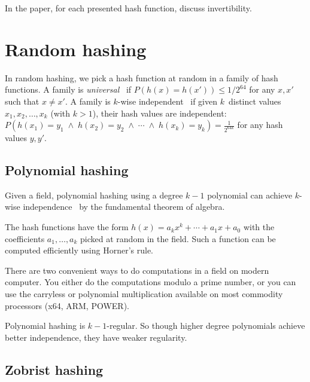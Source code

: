 \documentclass{article}
\begin{document}
In the paper, for each presented hash function, discuss invertibility.





\section{Random hashing}


In random hashing, 
we pick a hash function  at random in a family of
hash functions.  A family  is
  \emph{universal}~\cite{carter1979universal} if
 $P\left (h(x)=h(x')\right )\leq 1/2^64$
for any $x,x'$ such that $x \neq x'$.
A family is $k$-wise independent~\cite{lemi:one-pass-journal,Lemire2012604} if given  $k$~distinct values $x_1,x_2, \ldots, x_k$ (with $k>1$), their hash
values are independent: $
P\left (h(x_1)= y_1  \; \land  \; h(x_2)= y_2 \; \land  \; \cdots \; \land  \; h(x_k)= y_k  \right ) =\frac{1}{2^{64k}}$
for any hash values $y,y'$. 

\subsection{Polynomial hashing}
Given a field, polynomial hashing using a degree $k-1$ polynomial can achieve $k$-wise independence~\cite{carter1979universal,Thorup:2004:TBH:982792.982884} by the fundamental theorem of algebra.

The hash functions have the form $h(x)=a_{k} x^{k} + \cdots + a_{1} x + a_0$ with the coefficients $a_1, \ldots, a_k$ picked at random in the field. Such a function can be computed efficiently using Horner's rule.

There are two convenient ways to do computations in a field on modern computer. You either do the computations modulo a prime number, or you can use the carryless or polynomial multiplication available on most commodity processors (x64, ARM, POWER).

Polynomial hashing is $k-1$-regular. So though higher degree polynomials achieve better independence, they have weaker regularity.


\subsection{Zobrist hashing}
\end{document}
